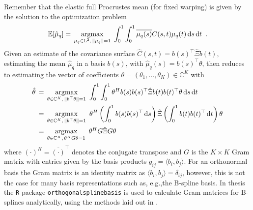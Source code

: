 Remember that the elastic full Procrustes mean (for fixed warping) is given by the solution to the optimization problem
\begin{equation}
\mathbb{E}[\hat\mu_q] = \, \operatorname*{argmax}_{\mu_q \in \mathbb{L}^2,\,\lVert\mu_q\rVert = 1}\,\,
   \int_0^1 \int_0^1 \overline{\mu_q (s)} C(s,t) \mu_q(t) \mathop{\mathrm{d}s}\mathop{\mathrm{d}t}\,\,.
\end{equation}
Given an estimate of the covariance surface $\hat{C}(s,t) = b(s)^\top \hat\Xi b(t)$, estimating  the mean $\hat \mu_q$ in a basis $b(s)$, with $\hat \mu_q (s) = b(s)^\top \theta$, then reduces to estimating the vector of coefficients $\theta = (\theta_1, \dots, \theta_K) \in \mathbb{C}^K$ with
\begin{align}
  \hat\theta& \, = \, \operatorname*{argmax}_{\theta \in \mathbb{C}^K,\,\lVert b^\top\theta\rVert = 1}\,\,
    \int_0^1 \int_0^1 \theta^H b(s) b(s)^\top \hat\Xi b(t) b(t)^\top \theta \mathop{\mathrm{d}s}\mathop{\mathrm{d}t} \\
  &\, = \, \operatorname*{argmax}_{\theta \in \mathbb{C}^K,\,\lVert b^\top\theta\rVert = 1}\,\,
    \theta^H \left( \int_0^1 b(s) b(s)^\top \mathop{\mathrm{d}s} \right) \hat\Xi \left( \int_0^1 b(t) b(t)^\top \mathop{\mathrm{d}t}\right) \theta \\
  &\, = \, \operatorname*{argmax}_{\theta \in \mathbb{C}^K,\,\theta^H G \theta = 1}\,\,
    \theta^H G \hat\Xi G \theta 
\end{align}
where $(\cdot)^H = \overline{(\cdot)}^\top$ denotes the conjugate transpose and $G$ is the $K \times K$ Gram matrix with entries given by the basis products $g_{ij} = \langle b_i, b_j \rangle$.
For an orthonormal basis the Gram matrix is an identity matrix as $\langle b_i, b_j \rangle = \delta_{ij}$, however, this is not the case for many basis representations such as, e.g.,the B-spline basis.
In thesis the \texttt{R} package \texttt{orthogonalsplinebasis} \parencite{orthogonalsplinebasis} is used to calculate Gram matrices for B-splines analytically, using the methods laid out in \cite{Redd2012}.

